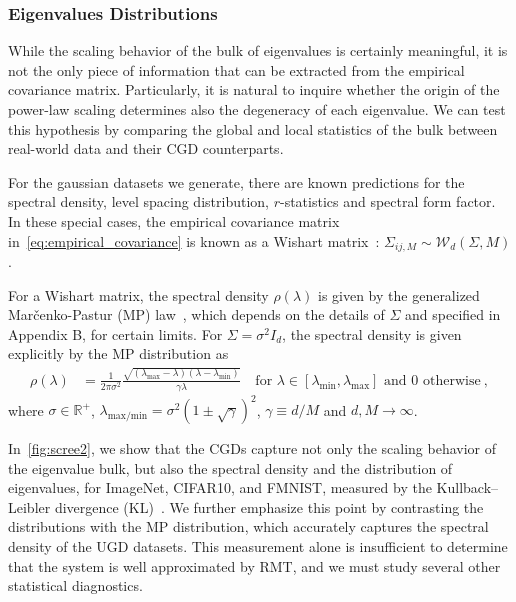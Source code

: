 \documentclass{article}
\begin{document}
\subsubsection{Eigenvalues Distributions}
While the scaling behavior of the bulk of eigenvalues is certainly meaningful, it is not the only piece of information that can be extracted from the empirical covariance matrix. Particularly, it is natural to inquire whether the origin of the power-law scaling determines also the degeneracy of each eigenvalue. We can test this hypothesis by comparing the global and local statistics of the bulk between real-world data and their CGD counterparts.


For the gaussian datasets we generate, there are known predictions for the spectral density, level spacing distribution, $r$-statistics and spectral form factor. In these special cases, the empirical covariance matrix in~\cref{eq:empirical_covariance} is known as a Wishart matrix~\citep{wishart1928generalised}: $\Sigma_{ij, M}\sim \mathcal{W}_d(\Sigma, M)$.

For a Wishart matrix, the spectral density $\rho(\lambda)$ is given by the generalized Marčenko-Pastur (MP) law~\citep{silverstein1995empirical,couillet_liao_2022}, which depends on the details of $\Sigma$ and specified in Appendix B, for certain limits. For $\Sigma = \sigma^2 I_d$, the spectral density is given explicitly by the MP distribution as
\begin{align}
\rho(\lambda) &= 
\frac{1}{2 \pi \sigma^2}  
\frac{\sqrt{(\lambda_{\text{max}}-\lambda)(\lambda-\lambda_{\text{min}})}}{ 
\gamma \lambda} 
\quad \text{for } \lambda \in [\lambda_{\text{min}}, \lambda_{\text{max}}] \text{ and 0 otherwise} \ ,
\end{align}
where $\sigma\in \mathbb{R}^+$, $\lambda_\mathrm{max/min} = \sigma^2 (1\pm \sqrt{\gamma})^2$, $\gamma \equiv d/M$ and $d,M \to \infty$.

In~\cref{fig:scree2}, we show that the CGDs capture not only the scaling behavior of the eigenvalue bulk, but also the spectral density and the distribution of eigenvalues, for ImageNet, CIFAR10, and FMNIST, measured by the Kullback–Leibler divergence (KL)~\citep{kullback1951information}.
We further emphasize this point by contrasting the distributions with the MP distribution, which accurately captures the spectral density of the UGD datasets.
This measurement alone is insufficient to determine that the system is well approximated by RMT, and we must study several other statistical diagnostics.
\end{document}
